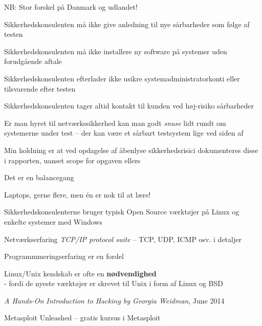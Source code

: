 \documentclass[Screen16to9,17pt]{foils}
\begin{document}
\begin{list2}
\item NB: Stor forskel på Danmark og udlandet!
\item Sikkerhedskonsulenten må ikke give anledning til nye sårbarheder
  som følge af testen
\item Sikkerhedskonsulenten må ikke installere ny software på
  systemer uden forudgående aftale
\item Sikkerhedskonsulenten efterlader ikke usikre
  systemadministratorkonti eller tilsvarende efter testen
\item Sikkerhedskonsulenten tager altid kontakt til kunden ved
  høj-risiko sårbarheder
\item Er man hyret til netværkssikkerhed kan man godt \emph{snuse}
  lidt rundt om systemerne under test -- der kan være et sårbart
  testsystem lige ved siden af
\item Min holdning er at ved opdagelse af åbenlyse sikkerhedsrisici
  dokumenteres disse i rapporten, uanset scope for opgaven ellers
\end{list2}

\centerline{Det er en balancegang}




\begin{list1}

\item Laptops, gerne flere, men én er nok til at lære!
\begin{list2}
\item Sikkerhedskonsulenterne bruger typisk Open Source værktøjer på Linux og
enkelte systemer med Windows
\item Netværkserfaring \emph{TCP/IP protocol suite} -- TCP, UDP, ICMP osv. i detaljer
\item Programmmeringserfaring er en fordel
\item Linux/Unix kendskab er ofte en {\bfseries nødvendighed}\\
- fordi de nyeste værktøjer er skrevet til Unix i form af Linux og BSD
\item \emph{A Hands-On Introduction to Hacking
by Georgia Weidman}, June 2014\\
\item Metasploit Unleashed -- gratis kursus i Metasploit\\
\end{list2}
\end{list1}
\end{document}
